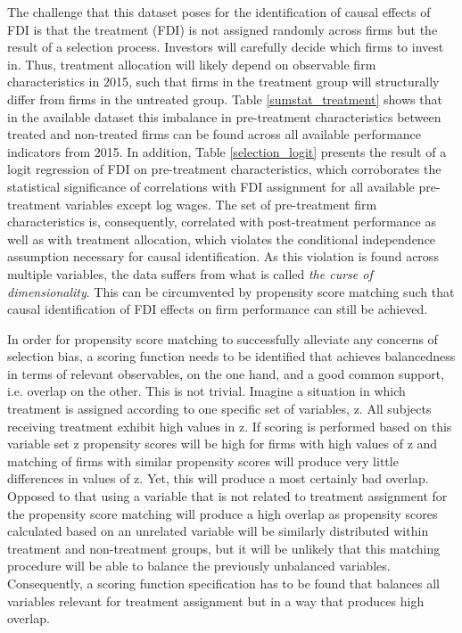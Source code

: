 
The challenge that this dataset poses for the identification of causal effects of FDI is that the treatment (FDI) is not assigned randomly across firms but the result of a selection process. Investors will carefully decide which firms to invest in. Thus, treatment allocation will likely depend on observable firm characteristics in 2015, such that firms in the treatment group will structurally differ from firms in the untreated group. Table \ref{sumstat_treatment} shows that in the available dataset this imbalance in pre-treatment characteristics between treated and non-treated firms can be found across all available performance indicators from 2015. In addition, Table \ref{selection_logit} presents the result of a logit regression of FDI on pre-treatment characteristics, which corroborates the statistical significance of correlations with FDI assignment for all available pre-treatment variables except log wages. The set of pre-treatment firm characteristics is, consequently, correlated with post-treatment performance as well as with treatment allocation, which violates the conditional independence assumption necessary for causal identification. As this violation is found across multiple variables, the data suffers from what is called \textit{the curse of dimensionality}. This can be circumvented by propensity score matching such that causal identification of FDI effects on firm performance can still be achieved.\\ \par 

 


 
 In order for propensity score matching to successfully alleviate any concerns of selection bias, a scoring function needs to be identified that achieves balancedness in terms of relevant observables, on the one hand, and a good common support, i.e. overlap on the other. This is not trivial. Imagine a situation in which treatment is assigned according to one specific set of variables, z. All subjects receiving treatment exhibit high values in z. If scoring is performed based on this variable set z propensity scores will be high for firms with high values of z and matching of firms with similar propensity scores will produce very little differences in values of z. Yet, this will produce a most certainly bad overlap. Opposed to that using a variable that is not related to treatment assignment for the propensity score matching will produce a high overlap as propensity scores calculated based on an unrelated variable will be similarly distributed within treatment and non-treatment groups, but it will be unlikely that this matching procedure will be able to balance the previously unbalanced variables. Consequently, a scoring function specification has to be found that balances all variables relevant for treatment assignment but in a way that produces high overlap. \\ \par 
 
